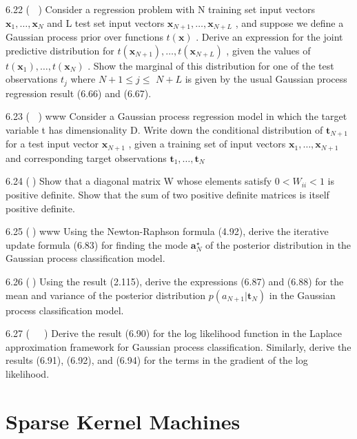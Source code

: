 \documentclass[
  10
]{article}
\begin{document}
6.22 ( ) Consider a regression problem with N training set input vectors
\(\mathbf { x } _ { 1 } , \ldots , \mathbf { x } _ { N }\) and L test
set input vectors
\(\mathbf { x } _ { N + 1 } , \dots , \mathbf { x } _ { N + L }\) , and
suppose we define a Gaussian process prior over functions
\(t ( \mathbf { x } )\) . Derive an expression for the joint predictive
distribution for
\(t ( \mathbf { x } _ { N + 1 } ) , \ldots , t ( \mathbf { x } _ { N + L } )\)
, given the values of
\(t ( \mathbf { x } _ { 1 } ) , \ldots , t ( \mathbf { x } _ { N } )\) .
Show the marginal of this distribution for one of the test observations
\(t _ { j }\) where \(N + 1 \leqslant j \leqslant\) \(N + L\) is given
by the usual Gaussian process regression result (6.66) and (6.67).

6.23 ( ) www Consider a Gaussian process regression model in which the
target variable t has dimensionality D. Write down the conditional
distribution of \(\mathbf { t } _ { N + 1 }\) for a test input vector
\(\mathbf { x } _ { N + 1 }\) , given a training set of input vectors
\(\mathbf { x } _ { 1 } , \ldots , \mathbf { x } _ { N + 1 }\) and
corresponding target observations
\(\mathbf { t } _ { 1 } , \ldots , \mathbf { t } _ { N }\)

6.24 () Show that a diagonal matrix W whose elements satisfy
\(0 < W _ { i i } < 1\) is positive definite. Show that the sum of two
positive definite matrices is itself positive definite.

6.25 () www Using the Newton-Raphson formula (4.92), derive the
iterative update formula (6.83) for finding the mode
\(\mathbf { a } _ { N } ^ { \star }\) of the posterior distribution in
the Gaussian process classification model.

6.26 () Using the result (2.115), derive the expressions (6.87) and
(6.88) for the mean and variance of the posterior distribution
\(p ( a _ { N + 1 } | \mathbf { t } _ { N } )\) in the Gaussian process
classification model.

6.27 (  ) Derive the result (6.90) for the log likelihood function in
the Laplace approximation framework for Gaussian process classification.
Similarly, derive the results (6.91), (6.92), and (6.94) for the terms
in the gradient of the log likelihood.

\section{Sparse Kernel Machines}\label{sparse-kernel-machines}
\end{document}
